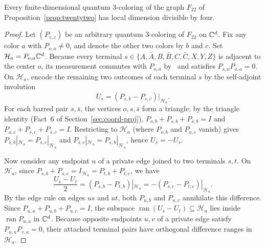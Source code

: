 \begin{proposition}\label{prop:small-dimension}
Every finite-dimensional quantum $3$-coloring of the graph $F_{22}$ of Proposition~\ref{prop:twentytwo} has local dimension divisible by four.
\end{proposition}
\begin{proof}
Let $(P_{v,c})$ be an arbitrary quantum $3$-coloring of $F_{22}$ on $\mathbb C^d$. Fix any color $a$ with $P_{o,a}\ne0$, and denote the other two colors by $b$ and $c$. Set $\mathcal H_a=P_{o,a}\mathbb C^d$. Because every terminal $s\in\{A,\bar A,B,\bar B,C,\bar C,X,Y,Z\}$ is adjacent to the center $o$, its measurement commutes with $P_{o,a}$ by~\cite[Lemma~2]{Ji} and satisfies $P_{s,a}P_{o,a}=0$. On $\mathcal H_a$, encode the remaining two outcomes of each terminal $s$ by the self-adjoint involution
\[
 U_s=(P_{s,b}-P_{s,c})|_{\mathcal H_a}.
\]
For each barred pair $s,\bar s$, the vertices $o,s,\bar s$ form a triangle; by the triangle identity (Fact~6 of Section~\ref{sec:coord-proj}), $P_{o,b}+P_{s,b}+P_{\bar s,b}=I$ and $P_{o,c}+P_{s,c}+P_{\bar s,c}=I$. Restricting to $\mathcal H_a$ (where $P_{o,b}$ and $P_{o,c}$ vanish) gives $P_{\bar s,b}|_{\mathcal H_a}=P_{s,c}|_{\mathcal H_a}$ and $P_{\bar s,c}|_{\mathcal H_a}=P_{s,b}|_{\mathcal H_a}$, hence $U_{\bar s}=-U_s$.

Now consider any endpoint $u$ of a private edge joined to two terminals $s,t$. On $\mathcal H_a$, since $P_{s,b}+P_{s,c}=I_{\mathcal H_a}=P_{t,b}+P_{t,c}$, we have
\[
 \frac{U_s-U_t}{2}=(P_{s,b}-P_{t,b})|_{\mathcal H_a}=-(P_{s,c}-P_{t,c})|_{\mathcal H_a}.
\]
By the edge rule on edges $us$ and $ut$, both $P_{u,b}$ and $P_{u,c}$ annihilate this difference. Since $P_{u,a}+P_{u,b}+P_{u,c}=I$, the subspace $\operatorname{ran}(U_s-U_t)\subseteq\mathcal H_a$ lies inside $\operatorname{ran} P_{u,a}$ in $\mathbb C^d$. Because opposite endpoints $u,v$ of a private edge satisfy $P_{u,a}P_{v,a}=0$, their attached terminal pairs have orthogonal difference ranges in $\mathcal H_a$.


\end{proof}
